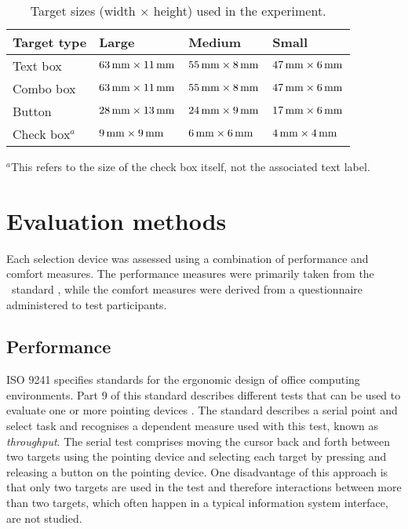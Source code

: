 \documentclass{elsart}
\begin{document}
\begin{table}
	\caption{Target sizes (width \(\times\) height) used in the experiment.}
	\label{tab-target-sizes}
	\begin{tabular}{llll}
		\hline
		\textbf{Target type}	&	\textbf{Large}							&	\textbf{Medium}							&	\textbf{Small}	\\
		\hline
		Text box				&	\(\unit[63]{mm} \times \unit[11]{mm}\)	&	\(\unit[55]{mm} \times \unit[8]{mm}\)	&	\(\unit[47]{mm} \times \unit[6]{mm}\)	\\
		Combo box				&	\(\unit[63]{mm} \times \unit[11]{mm}\)	&	\(\unit[55]{mm} \times \unit[8]{mm}\)	&	\(\unit[47]{mm} \times \unit[6]{mm}\)	\\
		Button					&	\(\unit[28]{mm} \times \unit[13]{mm}\)	&	\(\unit[24]{mm} \times \unit[9]{mm}\)	&	\(\unit[17]{mm} \times \unit[6]{mm}\)	\\
		Check box\(^{a}\)		&	\(\unit[9]{mm} \times \unit[9]{mm}\)	&	\(\unit[6]{mm} \times \unit[6]{mm}\)	&	\(\unit[4]{mm} \times \unit[4]{mm}\)	\\
		\hline
	\end{tabular}
	
	{\footnotesize \(^{a}\)This refers to the size of the check box itself, not the associated text label.}
\end{table}


\section{Evaluation methods}
\label{sec-evaluation}

Each selection device was assessed using a combination of performance
and comfort measures. The performance measures were primarily taken from
the \ISOnine\ standard \citep{ISO-2000-9241-9}, while the comfort
measures were derived from a questionnaire administered to test
participants.


\subsection{Performance}
\label{sec-evaluation-performance}

ISO 9241 specifies standards for the ergonomic design of office
computing environments. Part 9 of this standard describes different
tests that can be used to evaluate one or more pointing devices
\citep{ISO-2000-9241-9}. The standard describes a serial point and
select task and recognises a dependent measure used with this test,
known as \emph{throughput}. The serial test comprises moving the cursor
back and forth between two targets using the pointing device and
selecting each target by pressing and releasing a button on the pointing
device. One disadvantage of this approach is that only two targets are
used in the test and therefore interactions between more than two
targets, which often happen in a typical information system interface,
are not studied.
\end{document}
